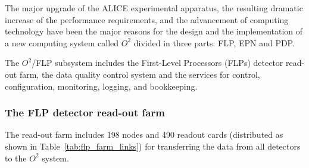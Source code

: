 ﻿%
%

The major upgrade of the ALICE experimental apparatus, the resulting dramatic increase of the performance requirements, and the advancement of computing technology have been the major reasons for the design and the implementation of a new computing system called $O^2$ divided in three parts: FLP, EPN and PDP. 

The $O^2$/FLP subsystem includes the First-Level Processors (FLPs) detector read-out farm, the data quality control system and the services for control, configuration, monitoring, logging, and bookkeeping. 
%
%
\subsubsection{The FLP detector read-out farm}
The read-out farm includes 198 nodes and 490 readout cards (distributed as shown in Table~\ref{tab:flp_farm_links}) for transferring the data from all detectors to the $O^2$ system.


